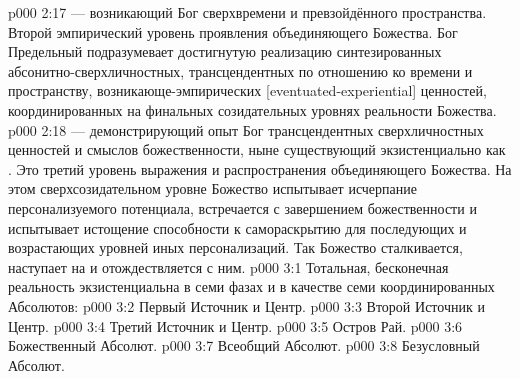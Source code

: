 \vs p000 2:17  --- возникающий Бог сверхвремени и превзойдённого пространства. Второй эмпирический уровень проявления объединяющего Божества. Бог Предельный подразумевает достигнутую реализацию синтезированных абсонитно\hyp{}сверхличностных, трансцендентных по отношению ко времени и пространству, возникающе\hyp{}эмпирических [eventuated\hyp{}experiential] ценностей, координированных на финальных созидательных уровнях реальности Божества.
\vs p000 2:18  --- демонстрирующий опыт Бог трансцендентных сверхличностных ценностей и смыслов божественности, ныне существующий экзистенциально как . Это третий уровень выражения и распространения объединяющего Божества. На этом сверхсозидательном уровне Божество испытывает исчерпание персонализуемого потенциала, встречается с завершением божественности и испытывает истощение способности к самораскрытию для последующих и возрастающих уровней иных персонализаций. Так Божество сталкивается, наступает на  и отождествляется с ним.
\vs p000 3:1 Тотальная, бесконечная реальность экзистенциальна в семи фазах и в качестве семи координированных Абсолютов:
\vs p000 3:2 Первый Источник и Центр.
\vs p000 3:3 Второй Источник и Центр.
\vs p000 3:4 Третий Источник и Центр.
\vs p000 3:5 Остров Рай.
\vs p000 3:6 Божественный Абсолют.
\vs p000 3:7 Всеобщий Абсолют.
\vs p000 3:8 Безусловный Абсолют.
